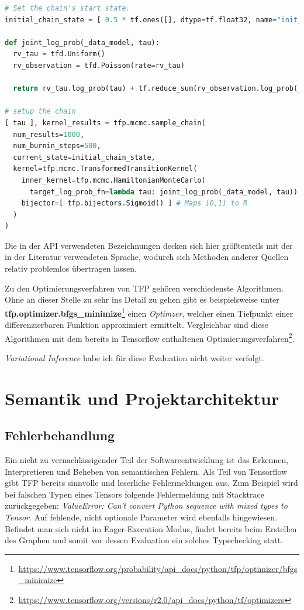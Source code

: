 \documentclass[12pt]{article}
\begin{document}
\begin{lstlisting}[language=Python, caption={Verwendung des Hamiltonian Monte Carlo Algorithmus (gekürzt)}, label={lst:mcmc}]
# Set the chain's start state.
initial_chain_state = [ 0.5 * tf.ones([], dtype=tf.float32, name="init_tau") ]

def joint_log_prob(_data_model, tau):
  rv_tau = tfd.Uniform()
  rv_observation = tfd.Poisson(rate=rv_tau)

  return rv_tau.log_prob(tau) + tf.reduce_sum(rv_observation.log_prob(_data_model))

# setup the chain
[ tau ], kernel_results = tfp.mcmc.sample_chain(
  num_results=1000,
  num_burnin_steps=500,
  current_state=initial_chain_state,
  kernel=tfp.mcmc.TransformedTransitionKernel(
    inner_kernel=tfp.mcmc.HamiltonianMonteCarlo(
      target_log_prob_fn=lambda tau: joint_log_prob(_data_model, tau)),
    bijector=[ tfp.bijectors.Sigmoid() ] # Maps [0,1] to R  
  )
)
\end{lstlisting}

Die in der API verwendeten Bezeichnungen decken sich hier größtenteils mit der in der Literatur verwendeten Sprache, wodurch sich Methoden anderer Quellen relativ problemlos übertragen lassen. 

Zu den Optimierungsverfahren von TFP gehören verschiedenste Algorithmen. Ohne an dieser Stelle zu sehr ins Detail zu gehen gibt es beispielsweise unter \textbf{tfp.optimizer.bfgs\_minimize}\footnote{\url{https://www.tensorflow.org/probability/api_docs/python/tfp/optimizer/bfgs_minimize}} einen \textit{Optimzer}\cite{Nocedal2006}, welcher einen Tiefpunkt einer differenzierbaren Funktion approximiert ermittelt. Vergleichbar sind diese Algorithmen mit dem bereits in Tensorflow enthaltenen Optimierungsverfahren\footnote{\url{https://www.tensorflow.org/versions/r2.0/api_docs/python/tf/optimizers}}.

\textit{Variational Inference} habe ich für diese Evaluation nicht weiter verfolgt.

\section{Semantik und Projektarchitektur}

\subsection{Fehlerbehandlung}
Ein nicht zu vernachlässigender Teil der Softwareentwicklung ist das Erkennen, Interpretieren und Beheben von semantischen Fehlern. Als Teil von Tensorflow gibt TFP bereits sinnvolle und leserliche Fehlermeldungen aus. Zum Beispiel wird bei falschen Typen eines Tensors folgende Fehlermeldung mit Stacktrace zurückgegeben: \textit{ValueError: Can't convert Python sequence with mixed types to Tensor}. Auf fehlende, nicht optionale Parameter wird ebenfalls hingewiesen. Befindet man sich nicht im Eager-Execution Modus, findet bereits beim Erstellen des Graphen und somit vor dessen Evaluation ein solches Typechecking statt. 
\end{document}
